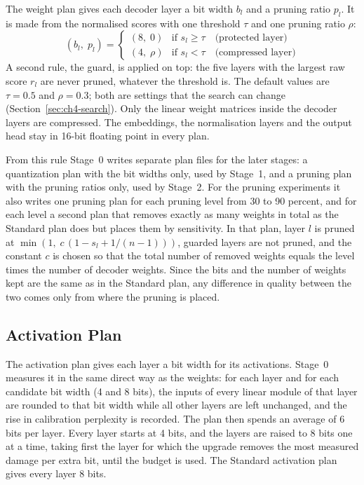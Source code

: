 \documentclass[
11pt, %
english, %
singlespacing, %
headsepline, %
]{MastersDoctoralThesis} %
\begin{document}
The weight plan gives each decoder layer a bit width $b_l$ and a pruning ratio $p_l$. It is made from the normalised scores with one threshold $\tau$ and one pruning ratio $\rho$:
\begin{equation}
  (b_l,\; p_l) = \left\{
  \begin{array}{ll}
    (8,\; 0) & \text{if } s_l \geq \tau \quad \text{(protected layer)} \\
    (4,\; \rho) & \text{if } s_l < \tau \quad \text{(compressed layer)}
  \end{array}
  \right.
  \label{eq:ch4-plan}
\end{equation}
A second rule, the guard, is applied on top: the five layers with the largest raw score $r_l$ are never pruned, whatever the threshold is. The default values are $\tau = 0.5$ and $\rho = 0.3$; both are settings that the search can change (Section~\ref{sec:ch4-search}). Only the linear weight matrices inside the decoder layers are compressed. The embeddings, the normalisation layers and the output head stay in 16-bit floating point in every plan.

From this rule Stage~0 writes separate plan files for the later stages: a quantization plan with the bit widths only, used by Stage~1, and a pruning plan with the pruning ratios only, used by Stage~2. For the pruning experiments it also writes one pruning plan for each pruning level from 30 to 90 percent, and for each level a second plan that removes exactly as many weights in total as the Standard plan does but places them by sensitivity. In that plan, layer $l$ is pruned at $\min(1,\; c\,(1 - s_l + 1/(n-1)))$, guarded layers are not pruned, and the constant $c$ is chosen so that the total number of removed weights equals the level times the number of decoder weights. Since the bits and the number of weights kept are the same as in the Standard plan, any difference in quality between the two comes only from where the pruning is placed.

\subsection{Activation Plan}
\label{sec:ch4-actplan}

The activation plan gives each layer a bit width for its activations. Stage~0 measures it in the same direct way as the weights: for each layer and for each candidate bit width (4 and 8 bits), the inputs of every linear module of that layer are rounded to that bit width while all other layers are left unchanged, and the rise in calibration perplexity is recorded. The plan then spends an average of 6 bits per layer. Every layer starts at 4 bits, and the layers are raised to 8 bits one at a time, taking first the layer for which the upgrade removes the most measured damage per extra bit, until the budget is used. The Standard activation plan gives every layer 8 bits.
\end{document}
